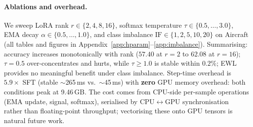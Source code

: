\paragraph{Ablations and overhead.}
We sweep LoRA rank $r \in \{2,4,8,16\}$, softmax temperature
$\tau \in \{0.5,\dots,3.0\}$, EMA decay $\alpha \in \{0.5,\dots,1.0\}$, and
class imbalance $\text{IF}\in\{1,2,5,10,20\}$ on Aircraft (all tables and
figures in Appendix~\ref{app:hparam}--\ref{app:imbalance}).
Summarising: accuracy increases monotonically with rank ($57.40$ at $r{=}2$ to
$62.08$ at $r{=}16$); $\tau{=}0.5$ over-concentrates and hurts, while
$\tau\!\geq\!1.0$ is stable within $0.2\%$; EWL provides no meaningful benefit
under class imbalance.
Step-time overhead is $5.9\times$ SFT (stable $\sim$265\,ms vs.\ $\sim$45\,ms)
with \textbf{zero} GPU memory overhead: both conditions peak at 9.46\,GB.
The cost comes from CPU-side per-sample operations (EMA update, signal,
softmax), serialised by CPU$\leftrightarrow$GPU synchronisation rather than
floating-point throughput; vectorising these onto GPU tensors is natural
future work.
